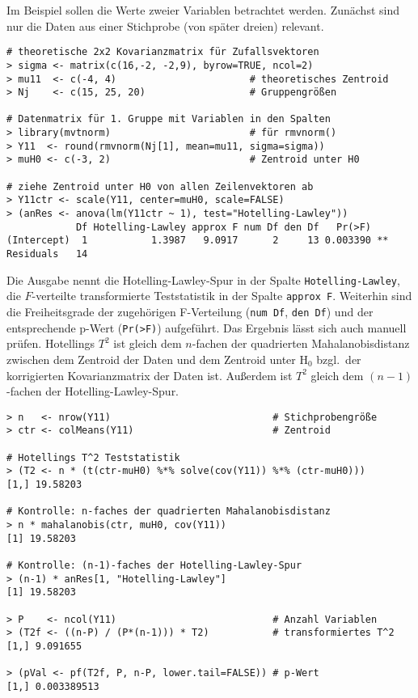 Im Beispiel sollen die Werte zweier Variablen betrachtet werden. Zunächst sind nur die Daten aus einer Stichprobe (von später dreien) relevant.
\begin{lstlisting}
# theoretische 2x2 Kovarianzmatrix für Zufallsvektoren
> sigma <- matrix(c(16,-2, -2,9), byrow=TRUE, ncol=2)
> mu11  <- c(-4, 4)                       # theoretisches Zentroid
> Nj    <- c(15, 25, 20)                  # Gruppengrößen

# Datenmatrix für 1. Gruppe mit Variablen in den Spalten
> library(mvtnorm)                        # für rmvnorm()
> Y11  <- round(rmvnorm(Nj[1], mean=mu11, sigma=sigma))
> muH0 <- c(-3, 2)                        # Zentroid unter H0

# ziehe Zentroid unter H0 von allen Zeilenvektoren ab
> Y11ctr <- scale(Y11, center=muH0, scale=FALSE)
> (anRes <- anova(lm(Y11ctr ~ 1), test="Hotelling-Lawley"))
            Df Hotelling-Lawley approx F num Df den Df   Pr(>F)
(Intercept)  1           1.3987   9.0917      2     13 0.003390 **
Residuals   14
\end{lstlisting}

Die Ausgabe nennt die Hotelling-Lawley-Spur in der Spalte \lstinline!Hotelling-Lawley!, die $F$-verteilte transformierte Teststatistik in der Spalte \lstinline!approx F!. Weiterhin sind die Freiheitsgrade der zugehörigen F-Verteilung (\lstinline!num Df!, \lstinline!den Df!) und der entsprechende p-Wert (\lstinline!Pr(>F)!) aufgeführt. Das Ergebnis lässt sich auch manuell prüfen. Hotellings $T^{2}$ ist gleich dem $n$-fachen der quadrierten Mahalanobisdistanz zwischen dem Zentroid der Daten und dem Zentroid unter $\text{H}_{0}$ bzgl.\ der korrigierten Kovarianzmatrix der Daten ist. Außerdem ist $T^{2}$ gleich dem $(n-1)$-fachen der Hotelling-Lawley-Spur.
\begin{lstlisting}
> n   <- nrow(Y11)                            # Stichprobengröße
> ctr <- colMeans(Y11)                        # Zentroid

# Hotellings T^2 Teststatistik
> (T2 <- n * (t(ctr-muH0) %*% solve(cov(Y11)) %*% (ctr-muH0)))
[1,] 19.58203

# Kontrolle: n-faches der quadrierten Mahalanobisdistanz
> n * mahalanobis(ctr, muH0, cov(Y11))
[1] 19.58203

# Kontrolle: (n-1)-faches der Hotelling-Lawley-Spur
> (n-1) * anRes[1, "Hotelling-Lawley"]
[1] 19.58203

> P    <- ncol(Y11)                           # Anzahl Variablen
> (T2f <- ((n-P) / (P*(n-1))) * T2)           # transformiertes T^2
[1,] 9.091655

> (pVal <- pf(T2f, P, n-P, lower.tail=FALSE)) # p-Wert
[1,] 0.003389513
\end{lstlisting}

